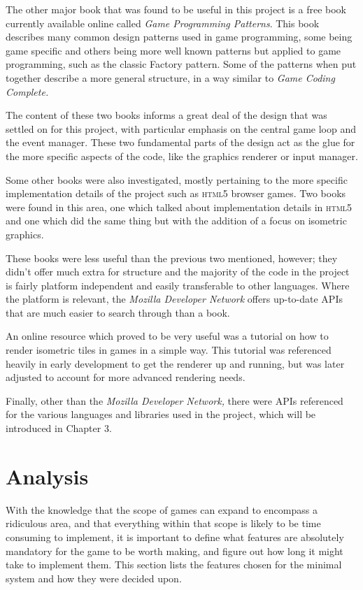 The other major book that was found to be useful in this project is a free book currently available online called \textit{Game Programming Patterns}\cite{citeulike:13049596}. This book describes many common design patterns used in game programming, some being game specific and others being more well known patterns but applied to game programming, such as the classic Factory pattern. Some of the patterns when put together describe a more general structure, in a way similar to \textit{Game Coding Complete.}

The content of these two books informs a great deal of the design that was settled on for this project, with particular emphasis on the central game loop and the event manager. These two fundamental parts of the design act as the glue for the more specific aspects of the code, like the graphics renderer or input manager.

Some other books were also investigated, mostly pertaining to the more specific implementation details of the project such as \textsc{html5} browser games. Two books were found in this area, one which talked about implementation details in \textsc{html5}\cite{citeulike:13000145} and one which did the same thing but with the addition of a focus on isometric graphics\cite{citeulike:13000170}.

These books were less useful than the previous two mentioned, however; they didn't offer much extra for structure and the majority of the code in the project is fairly platform independent and easily transferable to other languages. Where the platform is relevant, the \textit{Mozilla Developer Network}\cite{citeulike:13151262} offers up-to-date APIs that are much easier to search through than a book.

An online resource which proved to be very useful was a tutorial on how to render isometric tiles in games in a simple way\cite{citeulike:13139216}. This tutorial was referenced heavily in early development to get the renderer up and running, but was later adjusted to account for more advanced rendering needs.

Finally, other than the \textit{Mozilla Developer Network,} there were APIs referenced for the various languages and libraries used in the project, which will be introduced in Chapter 3.

\section{Analysis}
With the knowledge that the scope of games can expand to encompass a ridiculous area, and that everything within that scope is likely to be time consuming to implement, it is important to define what features are absolutely mandatory for the game to be worth making, and figure out how long it might take to implement them. This section lists the features chosen for the minimal system and how they were decided upon.

